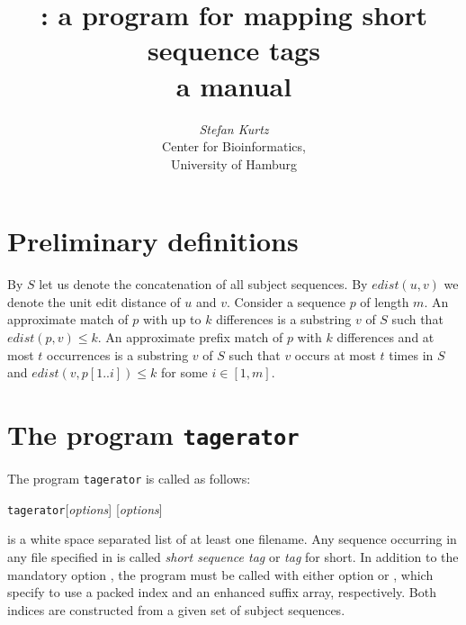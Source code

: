 \documentclass[12pt]{article}
\title{\Program: a program for mapping short sequence tags\\
       a manual}
\author{\begin{tabular}{c}
         \textit{Stefan Kurtz}\\
         Center for Bioinformatics,\\
         University of Hamburg
        \end{tabular}}
\newcommand{\Substring}[3]{#1[#2..#3]}
\newcommand{\Program}[0]{\texttt{tagerator}\xspace}
\begin{document}
\maketitle

\section{Preliminary definitions}
By \(S\) let us denote the concatenation of all subject sequences.
By \(edist(u,v)\) we denote the unit edit distance  of \(u\) and \(v\).
Consider a sequence \(p\) of length \(m\). An approximate match of \(p\) with 
up to \(k\) differences is a substring \(v\) of \(S\) such that 
\(edist(p,v)\leq k\). An approximate prefix match of \(p\) with \(k\) 
differences and at most \(t\) occurrences is a substring \(v\) of \(S\) such 
that \(v\) occurs at most \(t\) times in \(S\) and 
\(edist(v,\Substring{p}{1}{i})\leq k\) for some \(i\in[1,m]\).

\section{The program \Program}

The program \Program is called as follows:
\par
\noindent\Program [\textit{options}]   [\textit{options}] 
\par
{} is a white space separated list of at least one
filename. Any sequence occurring in any file specified in
 is called \textit{short sequence tag} or \textit{tag}
for short. In addition to the mandatory option , the program
must be called with either option  or ,
which specify to use a packed index and an enhanced suffix array,
respectively. Both indices are constructed from a given set of subject 
sequences. 
\end{document}

